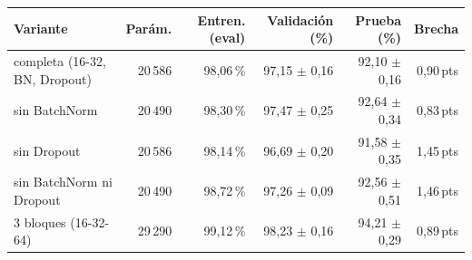 \begin{tabular}{lrrrrr}
\toprule
Variante & Parám. & Entren. (eval) & Validación (\%) & Prueba (\%) & Brecha \\
\midrule
completa (16-32, BN, Dropout) & 20\,586 & 98,06\,\% & 97,15 $\pm$ 0,16 & 92,10 $\pm$ 0,16 & 0,90\,pts \\
sin BatchNorm & 20\,490 & 98,30\,\% & 97,47 $\pm$ 0,25 & 92,64 $\pm$ 0,34 & 0,83\,pts \\
sin Dropout & 20\,586 & 98,14\,\% & 96,69 $\pm$ 0,20 & 91,58 $\pm$ 0,35 & 1,45\,pts \\
sin BatchNorm ni Dropout & 20\,490 & 98,72\,\% & 97,26 $\pm$ 0,09 & 92,56 $\pm$ 0,51 & 1,46\,pts \\
3 bloques (16-32-64) & 29\,290 & 99,12\,\% & 98,23 $\pm$ 0,16 & 94,21 $\pm$ 0,29 & 0,89\,pts \\
\bottomrule
\end{tabular}
